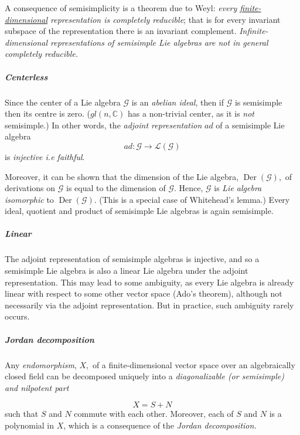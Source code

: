 \documentclass[aps,preprint]{revtex4}%
\begin{document}
A consequence of semisimplicity is a theorem due to Weyl: \emph{every
\underline{\emph{finite-dimensional}} representation is completely reducible};
that is for every invariant subspace of the representation there is an
invariant complement. \emph{Infinite-dimensional representations of semisimple
Lie algebras are not in general completely reducible.}

\subparagraph{Centerless}

Since the center of a Lie algebra $\mathcal{G}$ is an \emph{abelian ideal},
then if $\mathcal{G}$ is semisimple then its centre is zero. ($gl\left(
n,\mathbb{C}\right)  $ has a non-trivial center, as it is \emph{not
}semisimple.) In other words, the \emph{adjoint representation }$ad$ of a
semisimple Lie algebra
\begin{equation}
ad:\mathcal{G}\rightarrow\mathcal{L}\left(  \mathcal{G}\right)
\end{equation}
is \emph{injective i.e faithful}.

Moreover, it can be shown that the dimension of the Lie algebra,
$\operatorname{Der}\left(  \mathcal{G}\right)  ,$ of derivations on
$\mathcal{G}$ is equal to the dimension of $\mathcal{G}$. Hence, $\mathcal{G}$
is \emph{Lie algebra isomorphic} to $\operatorname{Der}\left(  \mathcal{G}%
\right)  .$ (This is a special case of Whitehead's lemma.) Every ideal,
quotient and product of semisimple Lie algebras is again semisimple.

\subparagraph{Linear}

The adjoint representation of semisimple algebras is injective, and so a
semisimple Lie algebra is also a linear Lie algebra under the adjoint
representation. This may lead to some ambiguity, as every Lie algebra is
already linear with respect to some other vector space (Ado's theorem),
although not necessarily via the adjoint representation. But in practice, such
ambiguity rarely occurs.

\subparagraph{Jordan decomposition}

Any \emph{endomorphism}, $X,$ of a finite-dimensional vector space over an
algebraically closed field can be decomposed uniquely into a
\emph{diagonalizable (or semisimple) and nilpotent part}%

\begin{equation}
X=S+N
\end{equation}
such that $S$ and $N$ commute with each other. Moreover, each of $S$ and $N$
is a polynomial in $X$, which is a consequence of the \emph{Jordan
decomposition.}
\end{document}
